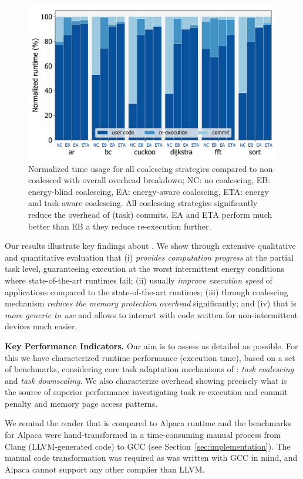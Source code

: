 \begin{figure}
	\centering
	\includegraphics[width=0.5\columnwidth]{figures/coalEfficiency}
	\caption{Normalized \sys time usage for all coalescing strategies compared to non-coalesced \sys with overall \sys overhead breakdown; NC: no coalescing, EB: energy-blind coalescing, EA: energy-aware coalescing, ETA: energy and task-aware coalescing. All \sys coalescing strategies significantly reduce the overhead of (task) commits. EA and ETA perform much better than EB a they reduce re-execution further. }
	\label{fig:overallOverheadBreakdown}
\end{figure}

Our results illustrate key findings about \sys. We show through extensive qualitative and quantitative evaluation that (i) \sys \emph{provides computation progress} at the partial task level, guaranteeing execution at the worst intermittent energy conditions where state-of-the-art runtimes fail; (ii) usually \emph{improve execution speed} of applications compared to the state-of-the-art runtimes; (iii) \sys through coalescing mechanism \emph{reduces the memory protection overhead} significantly; and (iv) that \sys is \emph{more generic to use} and allows to interact with code written for non-intermittent devices much easier. 

\textbf{Key Performance Indicators.} Our aim is to assess \sys as detailed as possible. For this we have characterized \sys runtime performance (execution time), based on a set of benchmarks, considering core task adaptation mechanisms of \sys: \emph{task coalescing} and \emph{task downscaling}. We also characterize \sys overhead showing precisely what is the source of \sys superior performance investigating task re-execution and commit penalty and memory page access patterns.

We remind the reader that \sys is compared to Alpaca runtime and the benchmarks for Alpaca were hand-transformed in a time-consuming manual process from Clang (LLVM-generated code) to GCC (see Section~\ref{sec:implementation}). The manual code transformation was required as \sys was written with GCC in mind, and Alpaca cannot support any other complier than LLVM.

